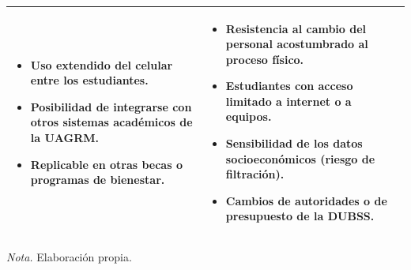 \begin{table}[H]
\begin{tabular}{|>{\raggedright\arraybackslash}p{7.4cm}|>{\raggedright\arraybackslash}p{7.4cm}|}
\begin{itemize}
\item Uso extendido del celular entre los estudiantes.
\item Posibilidad de integrarse con otros sistemas académicos de la UAGRM.
\item Replicable en otras becas o programas de bienestar.
\end{itemize} &
\begin{itemize}\setlength\itemsep{0pt}\setlength\leftmargin{0pt}
\item Resistencia al cambio del personal acostumbrado al proceso físico.
\item Estudiantes con acceso limitado a internet o a equipos.
\item Sensibilidad de los datos socioeconómicos (riesgo de filtración).
\item Cambios de autoridades o de presupuesto de la DUBSS.
\end{itemize} \\
\hline
\end{tabular}

\smallskip
\noindent\raggedright\textit{Nota.} Elaboración propia.
\end{table}
